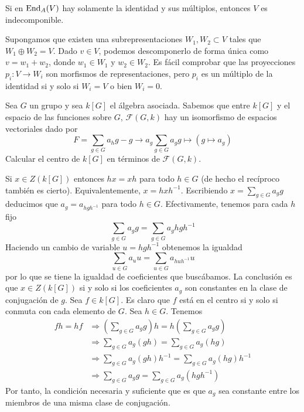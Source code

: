 \documentclass[twoside]{article}
\begin{document}
\begin{ejercicio}{3}
Si en $\operatorname{End}_A(V)$ hay solamente la identidad y sus múltiplos, entonces $V$ es indecomponible.
\end{ejercicio}
\begin{solucion}
Supongamos que existen una subrepresentaciones $W_1,W_2\subset V$ tales que $W_1\oplus W_2= V$. Dado $v\in V$, podemos descomponerlo de forma única como $v=w_1+w_2$, donde $w_1\in W_1$ y $w_2\in W_2$. Es fácil comprobar que las proyecciones $p_i:V\to W_i$ son morfismos de representaciones, pero $p_i$ es un múltiplo de la identidad si y solo si $W_i=V$ o bien $W_i=0$. 
\end{solucion}
\newpage
\begin{ejercicio}{4}
Sea $G$ un grupo y sea $k[G]$ el álgebra asociada. Sabemos que entre $k[G]$ y el espacio de las funciones sobre $G$, $\mathcal{F}(G,k)$ hay un isomorfismo de espacios vectoriales dado por
$$
F = \sum_{g\in G} a_h g - g\to a_g
 \sum_{g\in G} a_g g \mapsto (g\mapsto a_g)
$$
Calcular el centro de $k[G]$ en términos de $\mathcal{F}(G,k)$. 
\end{ejercicio}
\begin{solucion}
Si $x\in Z(k[G])$ entonces $hx=xh$ para todo $h\in G$ (de hecho el recíproco también es cierto). Equivalentemente, $x=hxh^{-1}$. Escribiendo $x=\sum_{g\in G}a_gg$ deducimos que $a_g=a_{hgh^{-1}}$ para todo $h\in G$. Efectivamente, tenemos para cada $h$ fijo
\[
\sum_{g\in G}a_gg=\sum_{g\in G}a_g hgh^{-1}
\]
Haciendo un cambio de variable $u=hgh^{-1}$ obtenemos la igualdad
\[
\sum_{u\in G}a_uu=\sum_{u\in G}a_{huh^{-1}} u
\]
por lo que se tiene la igualdad de coeficientes que buscábamos. La conclusión es que $x\in Z(k[G])$ si y solo si los coeficientes $a_g$ son constantes en la clase de conjugación de $g$. 
Sea $f\in k[G]$. Es claro que $f$ está en el centro si y solo si conmuta con cada elemento de $G$. Sea $h\in G$. Tenemos
\begin{align*}
fh =  hf &\Longrightarrow \left(\sum_{g\in G} a_g g \right)h = h\left(\sum_{g\in G} a_g g \right)\\
&\Longrightarrow \sum_{g \in G} a_g (gh) = \sum_{g \in G} a_g (hg) \\
&\Longrightarrow \sum_{g \in G} a_g (gh)h^{-1} = \sum_{g \in G} a_g (hg) h^{-1}\\
&\Longrightarrow \sum_{g \in G} a_g g = \sum_{g \in G} a_g (hgh^{-1}) 
\end{align*}
Por tanto, la condición necesaria y suficiente que es que $a_g$ sea constante entre los miembros de una misma clase de conjugación.
\end{solucion}
\end{document}
